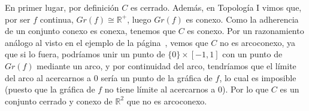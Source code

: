 \begin{ejercicio}
   En primer lugar, por definición $C$ es cerrado. Además, en Topología I vimos que, por ser $f$ continua, $Gr(f)\cong \mathbb{R}^+$, luego $Gr(f)$ es conexo. Como la adherencia de un conjunto conexo es conexa, tenemos que $C$ es conexo. Por un razonamiento análogo al visto en el ejemplo de la página~\pageref{ej:conexo_no_arcoconexo}, vemos que $C$ no es arcoconexo, ya que si lo fuera, podríamos unir un punto de $\{0\}\times [-1,1]$ con un punto de $Gr(f)$ mediante un arco, y por continuidad del arco, tendríamos que el límite del arco al acercarnos a $0$ sería un punto de la gráfica de $f$, lo cual es imposible (puesto que la gráfica de $f$ no tiene límite al acercarnos a $0$). Por lo que $C$ es un conjunto cerrado y conexo de $\mathbb{R}^2$ que no es arcoconexo.
   
   

    
\end{ejercicio}

